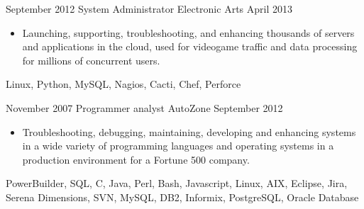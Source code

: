 \begin{experiences}
    \emptySeparator

    \experience
        {September 2012}
        {System Administrator}
        {Electronic Arts}
        {April 2013}
        {
            \begin{itemize}
                \item Launching, supporting, troubleshooting, and enhancing
                    thousands of servers and applications in the cloud, used 
                    for videogame traffic and data processing for millions of 
                    concurrent users.
            \end{itemize}
        }
        {
            Linux,
            Python,
            MySQL,
            Nagios,
            Cacti,
            Chef,
            Perforce
        }

    \emptySeparator

    \experience
        {November 2007}
        {Programmer analyst}
        {AutoZone}
        {September 2012}
        {
            \begin{itemize}
                \item Troubleshooting, debugging, maintaining, developing and 
                    enhancing systems in a wide variety of programming 
                    languages and operating systems in a production environment 
                    for a Fortune 500 company.
            \end{itemize}
        }
        {
            PowerBuilder, 
            SQL, 
            C, 
            Java, 
            Perl, 
            Bash, 
            Javascript, 
            Linux, 
            AIX, 
            Eclipse, 
            Jira, 
            Serena Dimensions, 
            SVN, 
            MySQL, 
            DB2, 
            Informix, 
            PostgreSQL, 
            Oracle Database
        }

\end{experiences}

